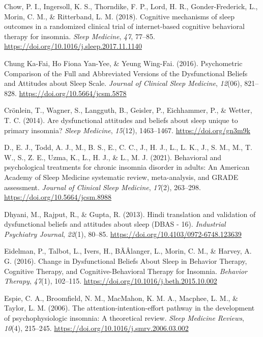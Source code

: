 \documentclass[
  ,doc,11pt, twoside,floatsintext]{apa6}
\newlength{\cslhangindent}
\newlength{\cslentryspacingunit} %
\newenvironment{CSLReferences}[2] %
 {%
  \setlength{\parindent}{0pt}
  \ifodd #1
  \let\oldpar\par
  \def\par{\hangindent=\cslhangindent\oldpar}
  \fi
  \setlength{\parskip}{#2\cslentryspacingunit}
 }%
 {}
\begin{document}
\begin{CSLReferences}{1}{0}
\leavevmode{}%
Chow, P. I., Ingersoll, K. S., Thorndike, F. P., Lord, H. R., Gonder-Frederick, L., Morin, C. M., \& Ritterband, L. M. (2018). Cognitive mechanisms of sleep outcomes in a randomized clinical trial of internet-based cognitive behavioral therapy for insomnia. \emph{Sleep Medicine}, \emph{47}, 77--85. \url{https://doi.org/10.1016/j.sleep.2017.11.1140}

\leavevmode{}%
Chung Ka-Fai, Ho Fiona Yan-Yee, \& Yeung Wing-Fai. (2016). Psychometric {Comparison} of the {Full} and {Abbreviated Versions} of the {Dysfunctional Beliefs} and {Attitudes} about {Sleep Scale}. \emph{Journal of Clinical Sleep Medicine}, \emph{12}(06), 821--828. \url{https://doi.org/10.5664/jcsm.5878}

\leavevmode{}%
Crönlein, T., Wagner, S., Langguth, B., Geisler, P., Eichhammer, P., \& Wetter, T. C. (2014). Are dysfunctional attitudes and beliefs about sleep unique to primary insomnia? \emph{Sleep Medicine}, \emph{15}(12), 1463--1467. \url{https://doi.org/gn3m9k}

\leavevmode{}%
D., E. J., Todd, A. J., M., B. S., E., C. C., J., H. J., L., L. K., J., S. M., M., T. W., S., Z. E., Uzma, K., L., H. J., \& L., M. J. (2021). Behavioral and psychological treatments for chronic insomnia disorder in adults: An {American Academy} of {Sleep Medicine} systematic review, meta-analysis, and {GRADE} assessment. \emph{Journal of Clinical Sleep Medicine}, \emph{17}(2), 263--298. \url{https://doi.org/10.5664/jcsm.8988}

\leavevmode{}%
Dhyani, M., Rajput, R., \& Gupta, R. (2013). Hindi translation and validation of dysfunctional beliefs and attitudes about sleep ({DBAS} - 16). \emph{Industrial Psychiatry Journal}, \emph{22}(1), 80--85. \url{https://doi.org/10.4103/0972-6748.123639}

\leavevmode{}%
Eidelman, P., Talbot, L., Ivers, H., BÃÂlanger, L., Morin, C. M., \& Harvey, A. G. (2016). Change in {Dysfunctional Beliefs About Sleep} in {Behavior Therapy}, {Cognitive Therapy}, and {Cognitive-Behavioral Therapy} for {Insomnia}. \emph{Behavior Therapy}, \emph{47}(1), 102--115. \url{https://doi.org/10.1016/j.beth.2015.10.002}

\leavevmode{}%
Espie, C. A., Broomfield, N. M., MacMahon, K. M. A., Macphee, L. M., \& Taylor, L. M. (2006). The attention-intention-effort pathway in the development of psychophysiologic insomnia: A theoretical review. \emph{Sleep Medicine Reviews}, \emph{10}(4), 215--245. \url{https://doi.org/10.1016/j.smrv.2006.03.002}


\end{CSLReferences}
\end{document}
